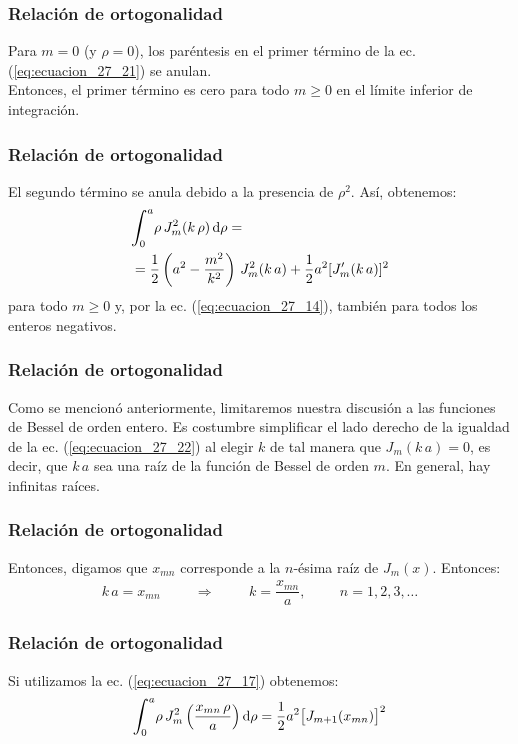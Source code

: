 \documentclass[12pt]{beamer}
\begin{document}
\begin{frame}
\frametitle{Relación de ortogonalidad}
Para $m = 0$ (y $\rho = 0$), los paréntesis en el primer término de la ec. (\ref{eq:ecuacion_27_21}) se anulan. 
\\
\bigskip
\pause
Entonces, el primer término es cero para todo $m \geq 0$ en el límite inferior de integración.
\end{frame}
\begin{frame}
\frametitle{Relación de ortogonalidad}
El segundo término se anula debido a la presencia de $\rho^{2}$. \pause Así, obtenemos:
\pause
\begin{equation}
\begin{aligned}[b]
&\scaleint{6ex}_{\bs 0}^{a} \rho \, J_{m}^{2} ( k \, \rho) \dd{\rho} = \\
&= \dfrac{1}{2} \left( a^{2} - \dfrac{m^{2}}{k^{2}} \right) \, J_{m}^{2} (k \, a) + \dfrac{1}{2} a^{2} [J_{m}^{\prime} (k \, a)]^{2}
\end{aligned}
\label{eq:ecuacion_27_22}
\end{equation}
\pause
para todo $m \geq 0$ y, por la ec. (\ref{eq:ecuacion_27_14}), también para todos los enteros negativos.
\end{frame}
\begin{frame}
\frametitle{Relación de ortogonalidad}
Como se mencionó anteriormente, limitaremos nuestra discusión a las funciones de Bessel de orden entero.
\pause
Es costumbre simplificar el lado derecho de la igualdad de la ec. (\ref{eq:ecuacion_27_22}) al elegir $k$ de tal manera que $J_{m} (k \, a) = 0$, es decir, que $k \, a$ sea una raíz de la función de Bessel de orden $m$. \pause En general, hay infinitas raíces.
\end{frame}
\begin{frame}
\frametitle{Relación de ortogonalidad}
Entonces, digamos que $x_{mn}$ corresponde a la $n$-ésima raíz de $J_m (x)$. \pause Entonces:
\pause
\begin{align*}
k \, a = x_{mn} \hspace{1cm} \Longrightarrow \hspace{1cm} k = \dfrac{x_{mn}}{a}, \hspace{1cm} n = 1, 2, 3, \ldots
\end{align*}
\end{frame}
\begin{frame}
\frametitle{Relación de ortogonalidad}
Si utilizamos la ec. (\ref{eq:ecuacion_27_17}) obtenemos:
\pause
\begin{equation}
\scaleint{6ex}_{\bs 0}^{a} \rho \, J_{m}^{2} \left(\dfrac{x_{mn} \, \rho}{a}   \right) \dd{\rho} = \dfrac{1}{2} a^{2} \big[ J_{m+1} (x_{mn}) \big]^{2}
\label{eq:ecuacion_27_23}
\end{equation}
\end{frame}
\end{document}
